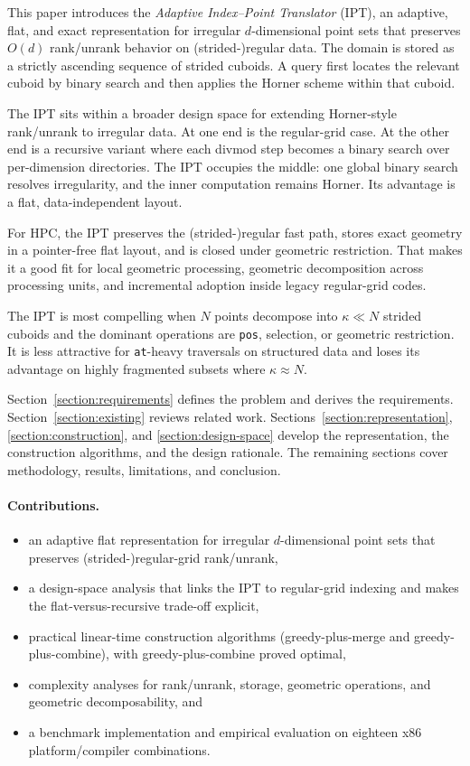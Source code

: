 \documentclass[manuscript,screen,review]{acmart}
\theoremstyle{definition}
\theoremstyle{plain}
\begin{document}
This paper introduces the \emph{Adaptive Index--Point Translator}
(IPT), an adaptive, flat, and exact representation for irregular
$d$-dimensional point sets that preserves $O(d)$ rank/unrank behavior
on (strided-)regular data. The domain is stored as a strictly
ascending sequence of strided cuboids. A query first locates the
relevant cuboid by binary search and then applies the Horner scheme
within that cuboid.

The IPT sits within a broader design space for extending Horner-style
rank/unrank to irregular data. At one end is the regular-grid case.
At the other end is a recursive variant where each divmod step becomes
a binary search over per-dimension directories. The IPT occupies the
middle: one global binary search resolves irregularity, and the inner
computation remains Horner. Its advantage is a flat,
data-independent layout.

For HPC, the IPT preserves the (strided-)regular fast path, stores
exact geometry in a pointer-free flat layout, and is closed under
geometric restriction. That makes it a good fit for local geometric
processing, geometric decomposition across processing units, and
incremental adoption inside legacy regular-grid codes.

The IPT is most compelling when $N$ points decompose into
$\kappa\ll N$ strided cuboids and the dominant operations are
\texttt{pos}, selection, or geometric restriction. It is less
attractive for \texttt{at}-heavy traversals on structured data and
loses its advantage on highly fragmented subsets where
$\kappa \approx N$.

Section~\ref{section:requirements} defines the problem and derives the
requirements. Section~\ref{section:existing} reviews related work.
Sections~\ref{section:representation}, \ref{section:construction}, and
\ref{section:design-space} develop the representation, the
construction algorithms, and the design rationale. The remaining
sections cover methodology, results, limitations, and conclusion.

\paragraph{Contributions.}
\begin{itemize}[leftmargin=*,nosep]
  \item an adaptive flat representation for irregular $d$-dimensional
    point sets that preserves (strided-)regular-grid rank/unrank,
  \item a design-space analysis that links the IPT to regular-grid
    indexing and makes the flat-versus-recursive trade-off explicit,
  \item practical linear-time construction algorithms
    (greedy-plus-merge and greedy-plus-combine), with
    greedy-plus-combine proved optimal,
  \item complexity analyses for rank/unrank, storage, geometric
    operations, and geometric decomposability, and
  \item a benchmark implementation and empirical evaluation on eighteen
    x86 platform/compiler combinations.
\end{itemize}
\end{document}
